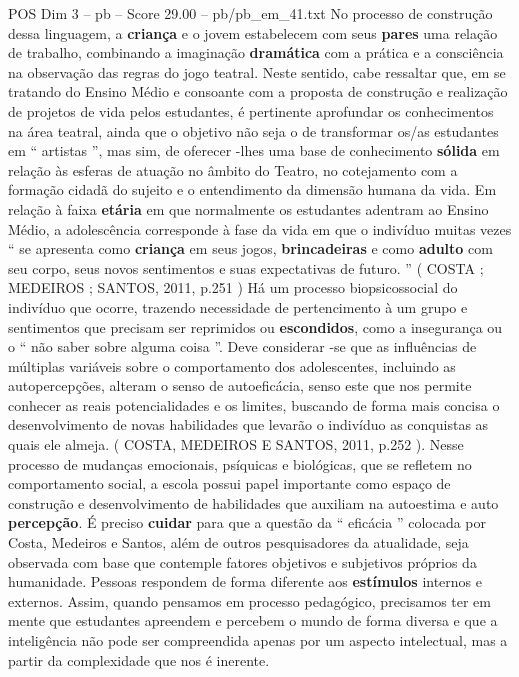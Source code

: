 \begin{textsample}{POS Dim 3 – pb – Score 29.00 – pb/pb\_em\_41.txt}
No processo de construção dessa linguagem, a \textbf{criança} e o jovem estabelecem com seus \textbf{pares} uma relação de trabalho, combinando a imaginação \textbf{dramática} com a prática e a consciência na observação das regras do jogo teatral.
Neste sentido, cabe ressaltar que, em se tratando do Ensino Médio e consoante com a proposta de construção e realização de projetos de vida pelos estudantes, é pertinente aprofundar os conhecimentos na área teatral, ainda que o objetivo não seja o de transformar os/as estudantes em “ artistas ”, mas sim, de oferecer -lhes uma base de conhecimento \textbf{sólida} em relação às esferas de atuação no âmbito do Teatro, no cotejamento com a formação cidadã do sujeito e o entendimento da dimensão humana da vida.
Em relação à faixa \textbf{etária} em que normalmente os estudantes adentram ao Ensino Médio, a adolescência corresponde à fase da vida em que o indivíduo muitas vezes “ se apresenta como \textbf{criança} em seus jogos, \textbf{brincadeiras} e como \textbf{adulto} com seu corpo, seus novos sentimentos e suas expectativas de futuro. ” ( COSTA ; MEDEIROS ; SANTOS, 2011, p.251 ) Há um processo biopsicossocial do indivíduo que ocorre, trazendo necessidade de pertencimento à um grupo e sentimentos que precisam ser reprimidos ou \textbf{escondidos}, como a insegurança ou o “ não saber sobre alguma coisa ”.
Deve considerar -se que as influências de múltiplas variáveis sobre o comportamento dos adolescentes, incluindo as autopercepções, alteram o senso de autoeficácia, senso este que nos permite conhecer as reais potencialidades e os limites, buscando de forma mais concisa o desenvolvimento de novas habilidades que levarão o indivíduo as conquistas as quais ele almeja. ( COSTA, MEDEIROS E SANTOS, 2011, p.252 ).
Nesse processo de mudanças emocionais, psíquicas e biológicas, que se refletem no comportamento social, a escola possui papel importante como espaço de construção e desenvolvimento de habilidades que auxiliam na autoestima e auto \textbf{percepção}.
É preciso \textbf{cuidar} para que a questão da “ eficácia ” colocada por Costa, Medeiros e Santos, além de outros pesquisadores da atualidade, seja observada com base que contemple fatores objetivos e subjetivos próprios da humanidade.
Pessoas respondem de forma diferente aos \textbf{estímulos} internos e externos.
Assim, quando pensamos em processo pedagógico, precisamos ter em mente que estudantes apreendem e percebem o mundo de forma diversa e que a inteligência não pode ser compreendida apenas por um aspecto intelectual, mas a partir da complexidade que nos é inerente.

\end{textsample}
